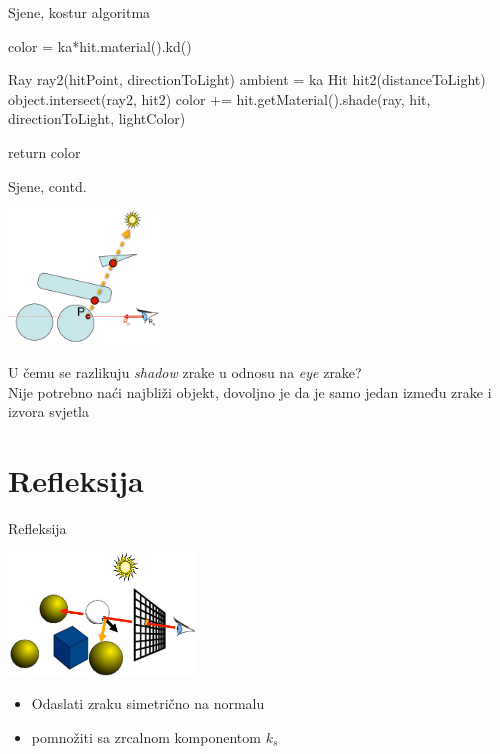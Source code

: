 \documentclass[9pt]{beamer}
\begin{document}
\begin{frame}{Sjene, kostur algoritma}
\begin{algorithm*}[H]
color = ka*hit.material().kd()\;
{
	Ray ray2(hitPoint, directionToLight)\;
	ambient = ka\;
	Hit hit2(distanceToLight)\;
	{
		object.intersect(ray2, hit2)\;
		{
			color += hit.getMaterial().shade(ray, hit, directionToLight, lightColor)\;
		}
	}
	
}
return color\;
\end{algorithm*}
\end{frame}

\begin{frame}{Sjene, contd.}
\begin{center}
\includegraphics[width=4cm]{slike/sjene_02.png}
\end{center}
U čemu se razlikuju \textit{shadow} zrake u odnosu na \textit{eye} zrake?\\
Nije potrebno naći najbliži objekt, dovoljno je da je samo jedan između zrake i izvora svjetla 
\end{frame}

\section{Refleksija}
\begin{frame}{Refleksija}

\begin{center}
\includegraphics[width=5cm]{slike/refleksija_01.png}
\end{center}
\begin{itemize}
\item Odaslati zraku simetrično na normalu
\item pomnožiti sa zrcalnom komponentom $k_s$
\end{itemize}
\end{frame}
\end{document}
